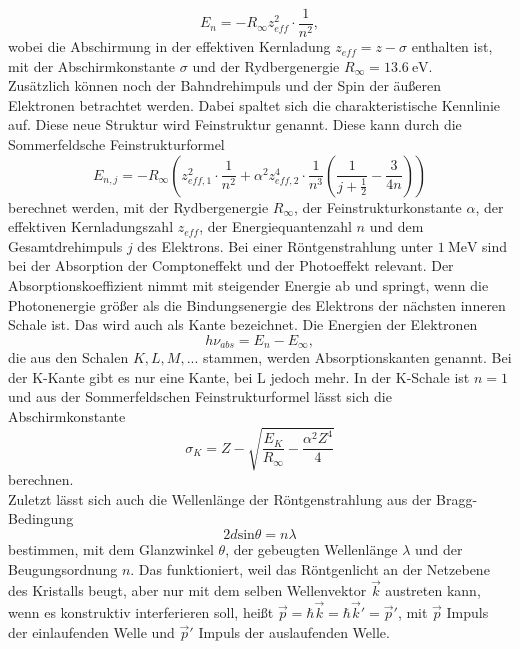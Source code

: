 \begin{equation}
  E_{n}=-R_{\infty}z_{eff}^2\cdot\frac{1}{n^2},
  \label{3}
\end{equation}
wobei die Abschirmung in der effektiven Kernladung $z_{eff}=z-\sigma$ enthalten ist, mit der Abschirmkonstante $\sigma$ und der Rydbergenergie $R_{\infty}=13.6\ \si{\eV}$.\\
Zusätzlich können noch der Bahndrehimpuls und der Spin der äußeren Elektronen betrachtet werden. Dabei spaltet sich die charakteristische Kennlinie auf. Diese neue Struktur wird Feinstruktur genannt. Diese kann durch die Sommerfeldsche Feinstrukturformel 
\begin{equation}
  E_{n,j}=-R_{\infty}\left(z^2_{eff,1}\cdot \frac{1}{n^2}+\alpha^2 z^4_{eff,2}\cdot\frac{1}{n^3}\left(\frac{1}{j+\frac{1}{2}}-\frac{3}{4n}\right)\right)
  \label{4}
\end{equation}
berechnet werden, mit der Rydbergenergie $R_{\infty}$, der Feinstrukturkonstante $\alpha$, der effektiven Kernladungszahl $z_{eff}$, der Energiequantenzahl $n$ und dem Gesamtdrehimpuls $j$ des Elektrons.
Bei einer Röntgenstrahlung unter $1\ \si{\MeV}$ sind bei der Absorption der Comptoneffekt und der Photoeffekt relevant. Der Absorptionskoeffizient nimmt mit steigender Energie ab und springt, wenn die Photonenergie größer als die Bindungsenergie des Elektrons der nächsten inneren Schale ist. Das wird auch als Kante bezeichnet. Die Energien der Elektronen 
\begin{equation}
  h\nu_{abs}=E_{n}-E_{\infty},
  \label{5}
\end{equation}
die aus den Schalen $K,L,M,...$ stammen, werden Absorptionskanten genannt. Bei der K-Kante gibt es nur eine Kante, bei L jedoch mehr. In der K-Schale ist $n=1$ und aus der Sommerfeldschen Feinstrukturformel lässt sich die Abschirmkonstante 
\begin{equation}
  \sigma_{K}=Z-\sqrt{\frac{E_{K}}{R_{\infty}}-\frac{\alpha^2 Z^4}{4}}
  \label{eq:6}
\end{equation}
berechnen.\\
Zuletzt lässt sich auch die Wellenlänge der Röntgenstrahlung aus der Bragg-Bedingung
\begin{equation}
  2d\textrm{sin}\theta=n\lambda
  \label{7}
\end{equation}
bestimmen, mit dem Glanzwinkel $\theta$, der gebeugten Wellenlänge $\lambda$ und der Beugungsordnung $n$. Das funktioniert, weil das Röntgenlicht an der Netzebene des Kristalls beugt, aber nur mit dem selben Wellenvektor $\vec k$ austreten kann, wenn es konstruktiv interferieren soll, heißt $\vec p=\hbar\vec k=\hbar\vec k'=\vec p'$, mit $\vec p$ Impuls der einlaufenden Welle und $\vec p'$ Impuls der auslaufenden Welle. 

